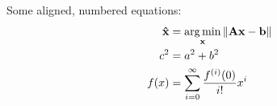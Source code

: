 %
%

Some aligned, numbered equations:
\begin{align}
\mathbf{\hat{x}} &= \operatorname*{arg\,min}_{\mathbf{x}}{\Vert \mathbf{Ax} - \mathbf{b} \Vert}\\
c^2 &= a^2 + b^2\\
f(x) &= \sum_{i=0}^{\infty}{\frac{f^{(i)}(0)}{i!}x^i}
\end{align}